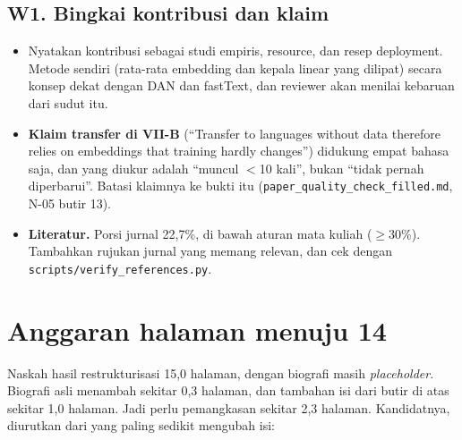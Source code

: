 \documentclass[10pt,a4paper]{article}
\begin{document}
\subsection*{W1. Bingkai kontribusi dan klaim}
\begin{itemize}
  \item Nyatakan kontribusi sebagai studi empiris, resource, dan resep deployment. Metode sendiri (rata-rata embedding dan kepala linear yang dilipat) secara konsep dekat dengan DAN dan fastText, dan reviewer akan menilai kebaruan dari sudut itu.
  \item \textbf{Klaim transfer di VII-B} (``Transfer to languages without data therefore relies on embeddings that training hardly changes'') didukung empat bahasa saja, dan yang diukur adalah ``muncul $<$10 kali'', bukan ``tidak pernah diperbarui''. Batasi klaimnya ke bukti itu (\texttt{paper\_quality\_check\_filled.md}, N-05 butir 13).
  \item \textbf{Literatur.} Porsi jurnal 22,7\%, di bawah aturan mata kuliah ($\ge$30\%). Tambahkan rujukan jurnal yang memang relevan, dan cek dengan \texttt{scripts/verify\_references.py}.
\end{itemize}

\section{Anggaran halaman menuju 14}
Naskah hasil restrukturisasi 15,0 halaman, dengan biografi masih \emph{placeholder}. Biografi asli menambah sekitar 0,3 halaman, dan tambahan isi dari butir di atas sekitar 1,0 halaman. Jadi perlu pemangkasan sekitar 2,3 halaman. Kandidatnya, diurutkan dari yang paling sedikit mengubah isi:
\end{document}
